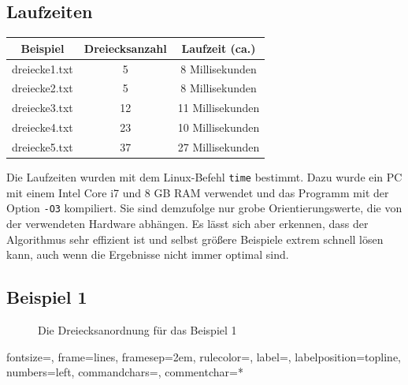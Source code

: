 \documentclass[a4paper, notitlepage, 12pt]{scrartcl}
\begin{document}
\subsection*{Laufzeiten}
\begin{table}[H]
	\begin{tabular}{|c|c|c|} 
		\hline
		Beispiel                                      & Dreiecksanzahl & Laufzeit (ca.)       \\ \hline \hline
		dreiecke1.txt                              & 5     & 8 Millisekunden    \\
		dreiecke2.txt                              & 5      & 8 Millisekunden     \\
		dreiecke3.txt                              & 12      & 11 Millisekunden     \\
		dreiecke4.txt                              & 23      & 10 Millisekunden    \\
		dreiecke5.txt                              & 37      & 27 Millisekunden    \\ \hline
	\end{tabular}
\end{table}
Die Laufzeiten wurden mit dem Linux-Befehl \texttt{time} bestimmt. Dazu wurde ein PC mit einem Intel Core i7 und 8 GB RAM verwendet und das Programm mit der Option \texttt{-O3} kompiliert. Sie sind demzufolge nur grobe Orientierungswerte, die von der verwendeten Hardware abhängen. Es lässt sich aber erkennen, dass der Algorithmus sehr effizient ist und selbst größere Beispiele extrem schnell lösen kann, auch wenn die Ergebnisse nicht immer optimal sind.
\subsection{Beispiel 1}
\begin{figure}[H] 
	
	\caption{Die Dreiecksanordnung für das Beispiel 1}
\end{figure}
%
{fontsize=\footnotesize,
	frame=lines,  %
	framesep=2em, %
	rulecolor=\color{Gray},
	label=,
	labelposition=topline,
	numbers=left,
	commandchars=\|\(\), %
	commentchar=*        %
}
\end{document}
